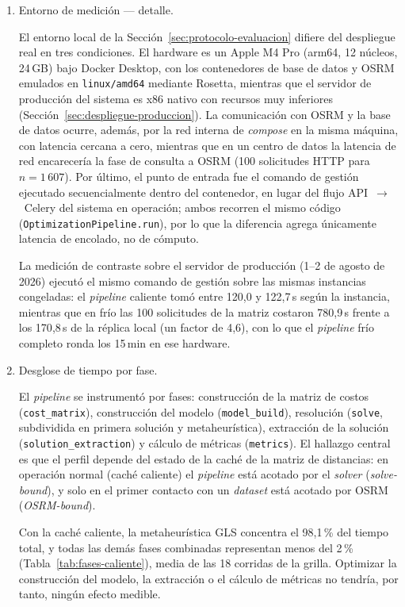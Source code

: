 \begin{enumerate}
\item Entorno de medición --- detalle.

El entorno local de la Sección~\ref{sec:protocolo-evaluacion} difiere del despliegue real en tres
condiciones. El hardware es un Apple M4 Pro (arm64, 12 núcleos, 24\,GB) bajo Docker Desktop, con
los contenedores de base de datos y OSRM emulados en \texttt{linux/amd64} mediante Rosetta,
mientras que el servidor de producción del sistema es x86 nativo con recursos muy inferiores
(Sección~\ref{sec:despliegue-produccion}). La comunicación con OSRM y la base de datos ocurre,
además, por la red interna de \textit{compose} en la misma máquina, con latencia cercana a cero,
mientras que en un centro de datos la latencia de red encarecería la fase de consulta a OSRM (100
solicitudes HTTP para $n=1\,607$). Por último, el punto de entrada fue el comando de gestión
ejecutado secuencialmente dentro del contenedor, en lugar del flujo API~$\rightarrow$~Celery del
sistema en operación; ambos recorren el mismo código (\texttt{OptimizationPipeline.run}), por lo
que la diferencia agrega únicamente latencia de encolado, no de cómputo.

La medición de contraste sobre el servidor de producción (1--2 de agosto de 2026) ejecutó el mismo
comando de gestión sobre las mismas instancias congeladas: el \textit{pipeline} caliente tomó entre
120{,}0 y 122{,}7\,s según la instancia, mientras que en frío las 100 solicitudes de la matriz
costaron 780{,}9\,s frente a los 170{,}8\,s de la réplica local (un factor de 4{,}6), con lo que el
\textit{pipeline} frío completo ronda los 15\,min en ese hardware.

\item Desglose de tiempo por fase.

El \textit{pipeline} se instrumentó por fases: construcción de la matriz de costos
(\texttt{cost\_matrix}), construcción del modelo (\texttt{model\_build}), resolución
(\texttt{solve}, subdividida en primera solución y metaheurística), extracción de la solución
(\texttt{solution\_extraction}) y cálculo de métricas (\texttt{metrics}). El hallazgo central es que
el perfil depende del estado de la caché de la matriz de distancias: en operación normal (caché
caliente) el \textit{pipeline} está acotado por el \textit{solver} (\textit{solve-bound}), y solo en
el primer contacto con un \textit{dataset} está acotado por OSRM (\textit{OSRM-bound}).

Con la caché caliente, la metaheurística GLS concentra el 98,1\,\% del tiempo total, y todas las
demás fases combinadas representan menos del 2\,\% (Tabla~\ref{tab:fases-caliente}), media de las
18 corridas de la grilla. Optimizar la construcción del modelo, la extracción o el cálculo de
métricas no tendría, por tanto, ningún efecto medible.


\end{enumerate}

